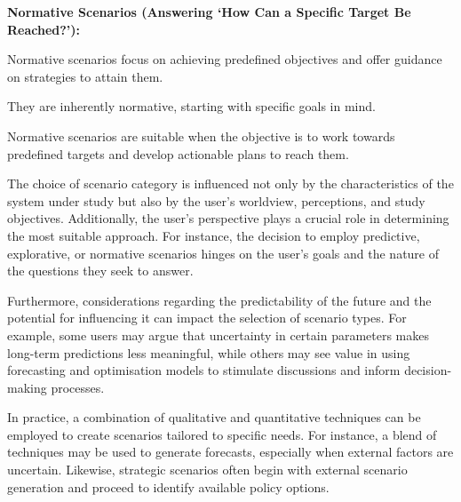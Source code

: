 {\large \textbf{Normative Scenarios (Answering `How Can a Specific Target Be Reached?'):}}
\begin{description}[leftmargin=2cm]
  \item [\textbf{Pros}:] Normative scenarios focus on achieving predefined objectives and offer guidance on strategies to attain them.
  \item [\textbf{Cons}:] They are inherently normative, starting with specific goals in mind.
  \item [\textbf{Applicability}:] Normative scenarios are suitable when the objective is to work towards predefined targets and develop actionable plans to reach them.
\end{description}

The choice of scenario category is influenced not only by the characteristics of the system under study but also by the user's worldview, perceptions, and study objectives. Additionally, the user's perspective plays a crucial role in determining the most suitable approach. For instance, the decision to employ predictive, explorative, or normative scenarios hinges on the user's goals and the nature of the questions they seek to answer.

Furthermore, considerations regarding the predictability of the future and the potential for influencing it can impact the selection of scenario types. For example, some users may argue that uncertainty in certain parameters makes long-term predictions less meaningful, while others may see value in using forecasting and optimisation models to stimulate discussions and inform decision-making processes.

In practice, a combination of qualitative and quantitative techniques can be employed to create scenarios tailored to specific needs. For instance, a blend of techniques may be used to generate forecasts, especially when external factors are uncertain. Likewise, strategic scenarios often begin with external scenario generation and proceed to identify available policy options.

